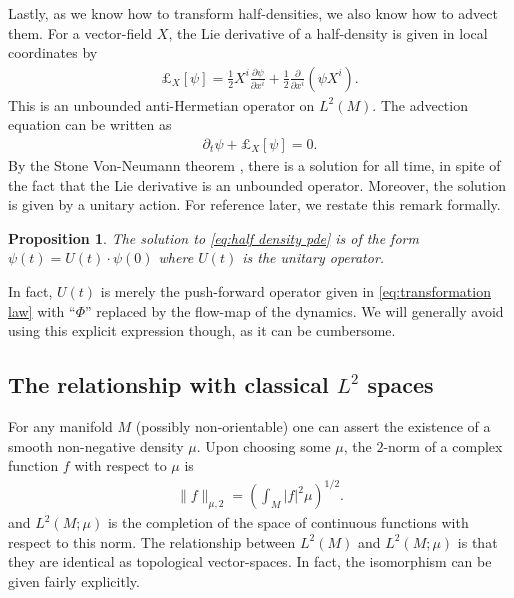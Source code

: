 \documentclass[12pt]{amsart}
\newcommand{\pder}[2]{\ensuremath{\frac{ \partial #1}{\partial #2}}}
\newtheorem{prop}[thm]{Proposition}
\begin{document}
Lastly, as we know how to transform half-densities, we also know how to advect them.
For a vector-field $X$, the Lie derivative of a half-density is given in local coordinates by
\begin{align}
	\pounds_{X}[\psi] = \frac{1}{2} X^{i} \pder{\psi}{x^{i}} + \frac{1}{2} \pder{}{x^{i}} \left( \psi X^{i} \right). \label{eq:half density pde}
\end{align}
This is an unbounded anti-Hermetian operator on $L^{2}(M)$.
The advection equation can be written as
\begin{align*}
	\partial_{t} \psi + \pounds_{X}[\psi] = 0.
\end{align*}
By the Stone Von-Neumann theorem \cite{Conway1990}, there is a solution for all time, in spite of the fact that the Lie derivative is an unbounded operator.
Moreover, the solution is given by a unitary action.  For reference later, we restate this remark formally.
\begin{prop} \label{prop:stone}
	The solution to \eqref{eq:half density pde} is of the form $\psi(t) = U(t) \cdot \psi(0)$ where $U(t)$ is
	the unitary operator.
\end{prop}

In fact, $U(t)$ is merely the push-forward operator given in \eqref{eq:transformation law} with ``$\Phi$'' replaced by the flow-map of the dynamics.
We will generally avoid using this explicit expression though, as it can be cumbersome.


\subsection{The relationship with classical $L^{2}$ spaces}
\label{sec:classical_Lebesgue}
For any manifold $M$ (possibly non-orientable) one can assert the existence of a smooth non-negative density $\mu$.
Upon choosing some $\mu$, the $2$-norm of a complex function $f$ with respect to $\mu$ is
\begin{align*}
	\| f \|_{\mu,2} =  \left( \int_M |f|^2 \mu \right)^{1/2}.
\end{align*}
and $L^2(M ; \mu)$ is the completion of the space of continuous functions with respect to this norm.
The relationship between $L^{2}(M)$ and $L^{2}(M;\mu)$ is that they are identical as topological vector-spaces.
In fact, the isomorphism can be given fairly explicitly.
\end{document}
